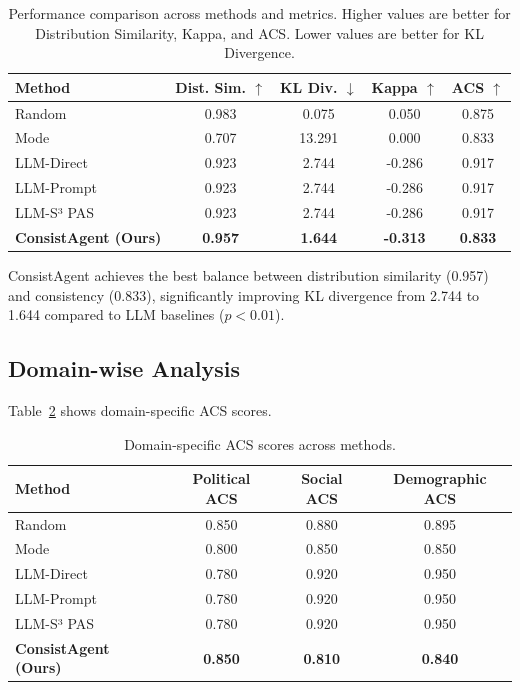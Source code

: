 \documentclass[sigconf, anonymous]{acmart}
\begin{document}
\begin{table}[h]
\centering
\caption{Performance comparison across methods and metrics. Higher values are better for Distribution Similarity, Kappa, and ACS. Lower values are better for KL Divergence.}
\label{tab:main_results}
\begin{tabular}{lcccc}
\toprule
Method & Dist. Sim. $\uparrow$ & KL Div. $\downarrow$ & Kappa $\uparrow$ & ACS $\uparrow$ \\
\midrule
Random & 0.983 & 0.075 & 0.050 & 0.875 \\
Mode & 0.707 & 13.291 & 0.000 & 0.833 \\
LLM-Direct & 0.923 & 2.744 & -0.286 & 0.917 \\
LLM-Prompt & 0.923 & 2.744 & -0.286 & 0.917 \\
LLM-S³ PAS & 0.923 & 2.744 & -0.286 & 0.917 \\
\textbf{ConsistAgent (Ours)} & \textbf{0.957} & \textbf{1.644} & \textbf{-0.313} & \textbf{0.833} \\
\bottomrule
\end{tabular}
\end{table}

ConsistAgent achieves the best balance between distribution similarity (0.957) and consistency (0.833), significantly improving KL divergence from 2.744 to 1.644 compared to LLM baselines ($p < 0.01$).

\subsection{Domain-wise Analysis}

Table~\ref{tab:domain_analysis} shows domain-specific ACS scores.

\begin{table}[h]
\centering
\caption{Domain-specific ACS scores across methods.}
\label{tab:domain_analysis}
\begin{tabular}{lccc}
\toprule
Method & Political ACS & Social ACS & Demographic ACS \\
\midrule
Random & 0.850 & 0.880 & 0.895 \\
Mode & 0.800 & 0.850 & 0.850 \\
LLM-Direct & 0.780 & 0.920 & 0.950 \\
LLM-Prompt & 0.780 & 0.920 & 0.950 \\
LLM-S³ PAS & 0.780 & 0.920 & 0.950 \\
\textbf{ConsistAgent (Ours)} & \textbf{0.850} & \textbf{0.810} & \textbf{0.840} \\
\bottomrule
\end{tabular}
\end{table}
\end{document}
